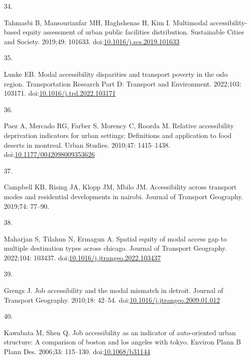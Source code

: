 \documentclass[10pt,letterpaper]{article}
\newlength{\cslhangindent}
\newlength{\csllabelwidth}
\newlength{\cslentryspacingunit} %
\newenvironment{CSLReferences}[2] %
 {%
  \setlength{\parindent}{0pt}
  \ifodd #1
  \let\oldpar\par
  \def\par{\hangindent=\cslhangindent\oldpar}
  \fi
  \setlength{\parskip}{#2\cslentryspacingunit}
 }%
 {}
\newcommand{\CSLLeftMargin}[1]{\parbox[t]{\csllabelwidth}{#1}}
\newcommand{\CSLRightInline}[1]{\parbox[t]{\linewidth - \csllabelwidth}{#1}\break}
\begin{document}
\begin{CSLReferences}{0}{0}
\leavevmode{}%
\CSLLeftMargin{34. }%
\CSLRightInline{Tahmasbi B, Mansourianfar MH, Haghshenas H, Kim I.
Multimodal accessibility-based equity assessment of urban public
facilities distribution. Sustainable Cities and Society. 2019;49:
101633.
doi:\href{https://doi.org/10.1016/j.scs.2019.101633}{10.1016/j.scs.2019.101633}}

\leavevmode{}%
\CSLLeftMargin{35. }%
\CSLRightInline{Lunke EB. Modal accessibility disparities and transport
poverty in the oslo region. Transportation Research Part D: Transport
and Environment. 2022;103: 103171.
doi:\href{https://doi.org/10.1016/j.trd.2022.103171}{10.1016/j.trd.2022.103171}}

\leavevmode{}%
\CSLLeftMargin{36. }%
\CSLRightInline{Paez A, Mercado RG, Farber S, Morency C, Roorda M.
Relative accessibility deprivation indicators for urban settings:
Definitions and application to food deserts in montreal. Urban Studies.
2010;47: 1415--1438.
doi:\href{https://doi.org/10.1177/0042098009353626}{10.1177/0042098009353626}}

\leavevmode{}%
\CSLLeftMargin{37. }%
\CSLRightInline{Campbell KB, Rising JA, Klopp JM, Mbilo JM.
Accessibility across transport modes and residential developments in
nairobi. Journal of Transport Geography. 2019;74: 77--90. }

\leavevmode{}%
\CSLLeftMargin{38. }%
\CSLRightInline{Maharjan S, Tilahun N, Ermagun A. Spatial equity of
modal access gap to multiple destination types across chicago. Journal
of Transport Geography. 2022;104: 103437.
doi:\href{https://doi.org/10.1016/j.jtrangeo.2022.103437}{10.1016/j.jtrangeo.2022.103437}}

\leavevmode{}%
\CSLLeftMargin{39. }%
\CSLRightInline{Grengs J. Job accessibility and the modal mismatch in
detroit. Journal of Transport Geography. 2010;18: 42--54.
doi:\href{https://doi.org/10.1016/j.jtrangeo.2009.01.012}{10.1016/j.jtrangeo.2009.01.012}}

\leavevmode{}%
\CSLLeftMargin{40. }%
\CSLRightInline{Kawabata M, Shen Q. Job accessibility as an indicator of
auto-oriented urban structure: A comparison of boston and los angeles
with tokyo. Environ Plann B Plann Des. 2006;33: 115--130.
doi:\href{https://doi.org/10.1068/b31144}{10.1068/b31144}}


\end{CSLReferences}
\end{document}
